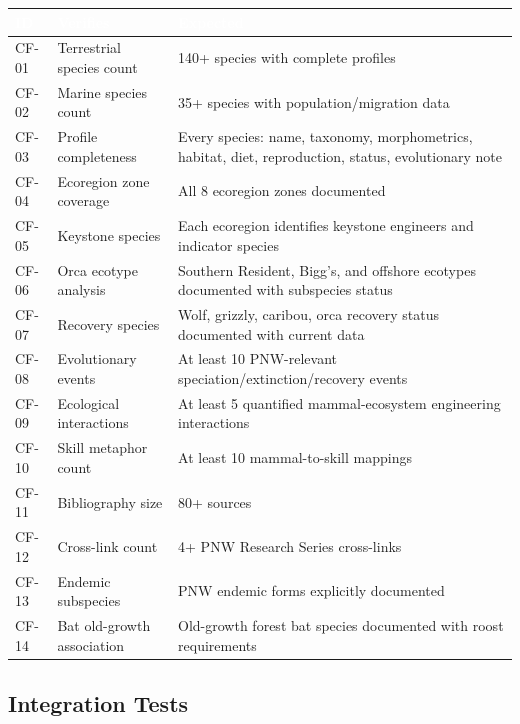 \documentclass[11pt,letterpaper]{article}
\newcommand{\tableheader}[1]{\textbf{\sffamily\textcolor{white}{#1}}}
\begin{document}
\begin{center}
\small
\begin{tabularx}{\textwidth}{C{1.2cm}L{3cm}X}
\toprule
{}
\tableheader{ID} & \tableheader{Verifies} & \tableheader{Expected} \\
\midrule
CF-01 & Terrestrial species count & 140+ species with complete profiles \\
CF-02 & Marine species count & 35+ species with population/migration data \\
CF-03 & Profile completeness & Every species: name, taxonomy, morphometrics, habitat, diet, reproduction, status, evolutionary note \\
CF-04 & Ecoregion zone coverage & All 8 ecoregion zones documented \\
CF-05 & Keystone species & Each ecoregion identifies keystone engineers and indicator species \\
CF-06 & Orca ecotype analysis & Southern Resident, Bigg's, and offshore ecotypes documented with subspecies status \\
CF-07 & Recovery species & Wolf, grizzly, caribou, orca recovery status documented with current data \\
CF-08 & Evolutionary events & At least 10 PNW-relevant speciation/extinction/recovery events \\
CF-09 & Ecological interactions & At least 5 quantified mammal-ecosystem engineering interactions \\
CF-10 & Skill metaphor count & At least 10 mammal-to-skill mappings \\
CF-11 & Bibliography size & 80+ sources \\
CF-12 & Cross-link count & 4+ PNW Research Series cross-links \\
CF-13 & Endemic subspecies & PNW endemic forms explicitly documented \\
CF-14 & Bat old-growth association & Old-growth forest bat species documented with roost requirements \\
\bottomrule
\end{tabularx}
\end{center}

\subsection{Integration Tests}
\end{document}
